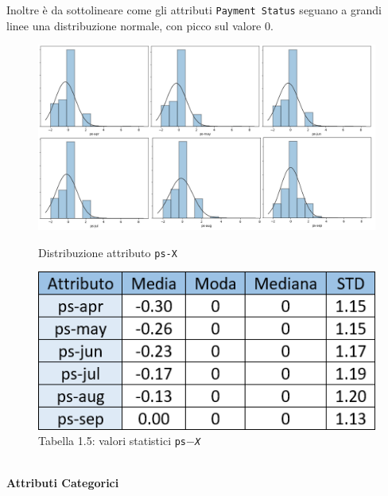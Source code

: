 Inoltre è da sottolineare come gli attributi \texttt{Payment Status} seguano a grandi linee una distribuzione normale, con picco sul valore 0.
\begin{figure}[!htb]
  \includegraphics[width=\linewidth]{img/ps-distribution.png}
  \caption{Distribuzione attributo \texttt{ps-X}}\label{ps-dist}
\endminipage\hfill
{}
  \includegraphics[width=\linewidth]{img/ps-stat.png}
\captionsetup{labelformat=empty}
\caption{Tabella 1.5: valori statistici \texttt{ps$-$\textit{X}}}
\label{ps-stat}
\endminipage\hfill
\end{figure}
\\
\textbf{Attributi Categorici}\\
